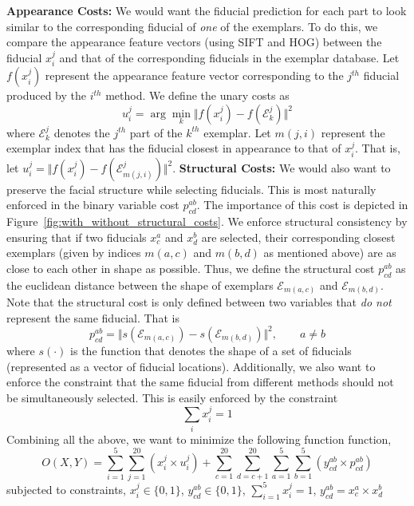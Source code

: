 \textbf{Appearance Costs:} We would want the fiducial prediction for each part to look similar to the corresponding fiducial  
of \emph{one} of the exemplars. To do this, we compare the appearance feature vectors (using SIFT
and HOG) between the fiducial $x_i^j$ and that of the corresponding fiducials in the exemplar
database.
Let $f(x^j_i)$ represent the appearance feature vector corresponding to the $j^{th}$ fiducial
produced by the $i^{th}$ method. We define the unary costs as
\begin{equation}
  u^j_i = \arg\min_k \Vert f(x^j_i) - f(\mathcal{E}^j_k) \Vert^2
\end{equation}
where $\mathcal{E}^j_k$ denotes the $j^{th}$ part of the $k^{th}$ exemplar. Let $m(j, i)$ represent
the exemplar index that has the fiducial closest in appearance to that of $x^j_i$. That is, 
let $u^j_i = \Vert f(x^j_i) - f(\mathcal{E}^j_{m(j,i)}) \Vert^2$.
\textbf{Structural Costs:} We would also want to preserve the facial structure while selecting fiducials. This is most
naturally enforced in the binary variable cost $p^{ab}_{cd}$. 
The importance of this cost is depicted in Figure~\ref{fig:with_without_structural_costs}.
We enforce structural consistency by ensuring that if
two fiducials $x^a_c$ and $x^b_d$ are selected, their corresponding closest exemplars (given
by indices $m(a,c)$ and $m(b,d)$ as mentioned above) are as close to each other in shape as
possible. Thus, we define the structural cost $p^{ab}_{cd}$ as the euclidean distance between
the shape of exemplars $\mathcal{E}_{m(a,c)}$ and $\mathcal{E}_{m(b,d)}$. Note that the structural
cost is only defined between two variables that \emph{do not} represent the same fiducial. 
That is
\begin{equation}
  p^{ab}_{cd} = \Vert s(\mathcal{E}_{m(a,c)}) - s(\mathcal{E}_{m(b,d)}) \Vert^2, \qquad a \ne b
\end{equation}
where $s(\cdot)$ is the function that denotes the shape of a set of fiducials (represented as a
vector of fiducial locations).
Additionally, we also want to enforce the constraint that the same fiducial from different methods
should not be simultaneously selected. This is easily enforced by the constraint
\begin{equation}
  \sum_i x^j_i = 1
\end{equation}
Combining all the above, we want to minimize the following function function,
\begin{equation}
O(X,Y) = \sum_{i=1}^{5} \sum_{j=1}^{20} (x^j_i \times u_i^j) + \sum_{c=1}^{20} \sum_{d=c+1}^{20} \sum_{a=1}^{5} \sum_{b=1}^{5} (y_{cd}^{ab} \times p_{cd}^{ab})
\end{equation}
subjected to constraints,
$x_i^j \in \{0,1\}$, $y_{cd}^{ab} \in \{0,1\}$, $\sum_{i=1}^5 x_i^j = 1$, $y_{cd}^{ab} = x_c^a \times x_d^b$


